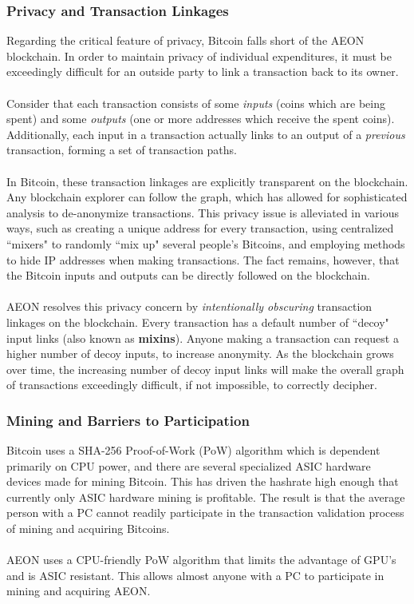 \subsubsection{Privacy and Transaction Linkages}
Regarding the critical feature of privacy, Bitcoin falls short of the AEON blockchain. In order to maintain privacy of individual expenditures, it must be exceedingly difficult for an outside party to link a transaction back to its owner.\\
\\
Consider that each transaction consists of some \textit{inputs} (coins which are being spent) and some \textit{outputs} (one or more addresses which receive the spent coins).  Additionally, each input in a transaction actually links to an output of a \textit{previous} transaction, forming a set of transaction paths.\\
\\
In Bitcoin, these transaction linkages are explicitly transparent on the blockchain. Any blockchain explorer can follow the graph, which has allowed for sophisticated analysis to de-anonymize transactions. This privacy issue is alleviated in various ways, such as creating a unique address for every transaction, using centralized “mixers" to randomly “mix up" several people's Bitcoins, and employing methods to hide IP addresses when making transactions.  The fact remains, however, that the Bitcoin inputs and outputs can be directly followed on the blockchain.\\
\\
AEON resolves this privacy concern by \textit{intentionally obscuring} transaction linkages on the blockchain. Every transaction has a default number of “decoy" input links (also known as \textbf{mixins}). Anyone making a transaction can request a higher number of decoy inputs, to increase anonymity.  As the blockchain grows over time, the increasing number of decoy input links will make the overall graph of transactions exceedingly difficult, if not impossible, to correctly decipher.

\subsubsection{Mining and Barriers to Participation}
Bitcoin uses a SHA-256 Proof-of-Work (PoW) algorithm which is dependent primarily on CPU power, and there are several specialized ASIC hardware devices made for mining Bitcoin. This has driven the hashrate high enough that currently only ASIC hardware mining is profitable.  The result is that the average person with a PC cannot readily participate in the transaction validation process of mining and acquiring Bitcoins.\\
\\
AEON uses a CPU-friendly PoW algorithm that limits the advantage of GPU’s and is ASIC resistant. This allows almost anyone with a PC to participate in mining and acquiring AEON. 

